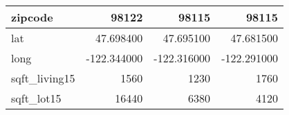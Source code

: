 \begin{table}[H]
\begin{tabular}{|l|r|r|r|}
\hline zipcode & \cellcolor[rgb]{0.9, 0.54, 0.52} 98122 & 98115 & 98115 \\
\hline lat & \cellcolor[rgb]{0.9, 0.54, 0.52} 47.698400 & 47.695100 & 47.681500 \\
\hline long & \cellcolor[rgb]{0.9, 0.54, 0.52} -122.344000 & \cellcolor[rgb]{0.9, 0.54, 0.52} -122.316000 & \cellcolor[rgb]{0.9, 0.54, 0.52} -122.291000 \\
\hline sqft\_living15 & \cellcolor[rgb]{0.9, 0.54, 0.52} 1560 & 1230 & 1760 \\
\hline sqft\_lot15 & \cellcolor[rgb]{0.9, 0.54, 0.52} 16440 & 6380 & 4120 \\
\hline
\end{tabular}
\end{table}
